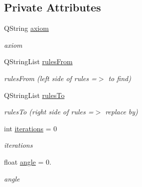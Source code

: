 \subsection*{Private Attributes}
\begin{DoxyCompactItemize}
\item 
\mbox{\label{classLSystem_ab99dbbdfaf40b3af663cd83e4b7de0c6}} 
Q\+String \hyperlink{classLSystem_ab99dbbdfaf40b3af663cd83e4b7de0c6}{axiom}
\begin{DoxyCompactList}\small\item\em axiom \end{DoxyCompactList}\item 
\mbox{\label{classLSystem_aaed954938814e9dcb45eea0fd54d7028}} 
Q\+String\+List \hyperlink{classLSystem_aaed954938814e9dcb45eea0fd54d7028}{rules\+From}
\begin{DoxyCompactList}\small\item\em rules\+From (left side of rules =$>$ to find) \end{DoxyCompactList}\item 
\mbox{\label{classLSystem_a9e4d67b3bbe6fcad3d1fd33b741781db}} 
Q\+String\+List \hyperlink{classLSystem_a9e4d67b3bbe6fcad3d1fd33b741781db}{rules\+To}
\begin{DoxyCompactList}\small\item\em rules\+To (right side of rules =$>$ replace by) \end{DoxyCompactList}\item 
\mbox{\label{classLSystem_a53b8cc7f0e56dfb4c6f85dd5992178cc}} 
int \hyperlink{classLSystem_a53b8cc7f0e56dfb4c6f85dd5992178cc}{iterations} = 0
\begin{DoxyCompactList}\small\item\em iterations \end{DoxyCompactList}\item 
\mbox{\label{classLSystem_a708c4519815c1ca46773135e5ac21961}} 
float \hyperlink{classLSystem_a708c4519815c1ca46773135e5ac21961}{angle} = 0.
\begin{DoxyCompactList}\small\item\em angle \end{DoxyCompactList}\item 
\mbox{\label{classLSystem_a11e55d3bb6e352b4e1583f382b43a8a7}} 

\end{DoxyCompactItemize}
